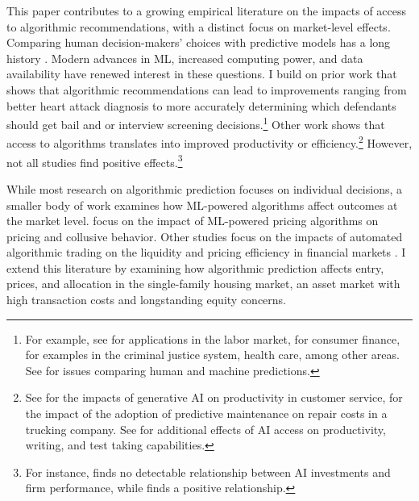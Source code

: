 \documentclass[11pt]{article}
\begin{document}
This paper contributes to a growing empirical literature on the impacts of access to algorithmic recommendations, with a distinct focus on market-level effects. Comparing human decision-makers' choices with predictive models has a long history \citep{dawes1971, dawes1989, dawesbook2001}. Modern advances in ML, increased computing power, and data availability have renewed interest in these questions. I build on prior work that shows that algorithmic recommendations can lead to improvements ranging from better heart attack diagnosis to more accurately determining which defendants should get bail and or interview screening decisions.\footnote{For example, see \citet{autor2008, li_hiring_2025, Raghavan_2020, frankelSelectingApplicants2021, whitehouse2022, oecd2023} for applications in the labor market, \citet{einav2013, fuster2022, gillis_2019, dobbieetal, blattnerHowCostlyNoise2021} for consumer finance, \citet{mullainathanobermeyer2022, obermeyerPredictingFutureBig2016, kleinberg_inherent_2016, chouldechovaCaseStudyAlgorithmassisted2018, abaluckFixingMisallocationGuidelines2020, kleinberg2017, mullainathanPredictiveAlgorithmsAutomatic2023} for examples in the criminal justice system, health care, among other areas. See \citet{rambachanIdentifyingPredictionMistakes, mullainathanbail2017, kleinbergPredictionPolicyProblems2015b} for issues comparing human and machine predictions.} Other work shows that access to algorithms translates into improved productivity or efficiency.\footnote{See \citet{brynjolfsson_generative_2025} for the impacts of generative AI on productivity in customer service, \citet{harrisyellen2023} for the impact of the adoption of predictive maintenance on repair costs in a trucking company. See \citet{bubeck2023sparks, choiAIAssistanceLegal2023, peng2023check, noyExperimentalEvidenceProductivity2023} for additional effects of AI access on productivity, writing, and test taking capabilities.} However, not all studies find positive effects.\footnote{For instance, \citet{acemoglu2022} finds no detectable relationship between AI investments and firm performance, while \citet{babina2022} finds a positive relationship.}

While most research on algorithmic prediction focuses on individual decisions, a smaller body of work examines how ML-powered algorithms affect outcomes at the market level. \citet{calvanoAI, assad2023, calderwang2023, mackaybrownpricing} focus on the impact of ML-powered pricing algorithms on pricing and collusive behavior. Other studies focus on the impacts of automated algorithmic trading on the liquidity and pricing efficiency in financial markets \citep{hendershottDoesAlgorithmicTrading2011, chaboudRiseMachinesAlgorithmic2014, upsonMultipleMarketsAlgorithmic2017}. I extend this literature by examining how algorithmic prediction affects entry, prices, and allocation in the single-family housing market, an asset market with high transaction costs and longstanding equity concerns. 
\end{document}
